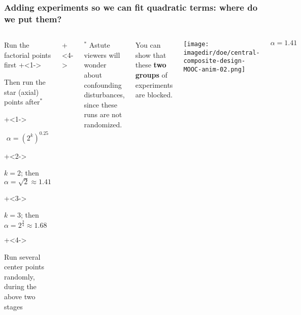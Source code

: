 \documentclass[handout,11pt,aspectratio=169,mathserif]{beamer}
\begin{document}
\begin{frame}\frametitle{Adding experiments so we can fit quadratic terms: where do we put them?}
	\begin{columns}[T]
		
			\vspace{1cm}
			
			\begin{itemize}
				\item	Run the factorial points first
				\onslide+<1->{
					\item	Then run the star (axial) points after$^\ast$
				}
				\onslide+<1->{
					\Large
					\[\alpha  = \left(2^k\right)^{0.25}\]
					
			
					\begin{itemize}
						\onslide+<2->{\item	$k = 2$; then $\alpha = \sqrt{2} \approx 1.41$ }
						\onslide+<3->{\item	$k = 3$; then $\alpha = 2^{\tfrac{3}{4}} \approx 1.68$}
					\end{itemize}
					\normalsize
				}
				\onslide+<4->{
					\item	Run several center points randomly, during the above two stages
				}
			\end{itemize}
			
			\onslide+<4->{
				\vspace{0cm}
				\tiny
				$^\ast$ Astute viewers will wonder about confounding disturbances, since these runs are not randomized.
			
				You can show that these {\color[rgb]{0,0.5,1}\textbf{two}} {\color[rgb]{0.5,0, 0.5}\textbf{groups}} of experiments are blocked.
			}
			
			
			\centerline{\texttt{[image: \\imagedir/doe/central-composite-design-MOOC-anim-02.png]}}
			
			\vspace{-0.5cm}
			\[\alpha = 1.41\]
	\end{columns}
\end{frame}
\end{document}
